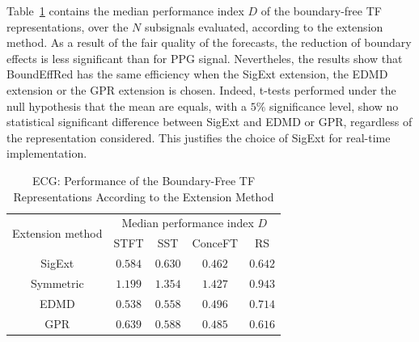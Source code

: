 \documentclass[journal,onecolumn]{IEEEtran}
\begin{document}
Table~\ref{tab:otd.ecg} contains the median performance index $D$ of the boundary-free TF representations, over the $N$ subsignals evaluated, according to the extension method. As a result of the fair quality of the forecasts, the reduction of boundary effects is less significant than for PPG signal. Nevertheles, the results show that {\sf BoundEffRed} has the same efficiency when the {\sf SigExt} extension, the EDMD extension or the GPR extension is chosen. Indeed, t-tests performed under the null hypothesis that the mean are equals, with a $5\%$ significance level, show no statistical significant difference between {\sf SigExt} and EDMD or GPR, regardless of the representation considered. This justifies the choice of {\sf SigExt} for real-time implementation.

\begin{table}
\centering
\caption{ECG: Performance of the Boundary-Free TF Representations According to the Extension Method}
\begin{tabular}{|c||c|c|c|c|}
  \hline
   \multirow{2}{40pt}{\centering Extension method} & \multicolumn{4}{c|}{Median performance index $D$} \\
   \cline{2-5}
      & STFT & SST & ConceFT & RS\\
   \hhline{|=#=|=|=|=|}
   {\sf SigExt} & $0.584$ & $0.630$ & $0.462$ & $0.642$ \\
   \hline
   Symmetric & $1.199$ & $1.354$ & $1.427$ & $0.943$ \\
   \hline
   EDMD & $0.538$ & $0.558$ & $0.496$ & $0.714$ \\
   \hline
   GPR & $0.639$ & $0.588$ & $0.485$ & $0.616$ \\
   \hline
\end{tabular}
\label{tab:otd.ecg}
\end{table}




\end{document}
